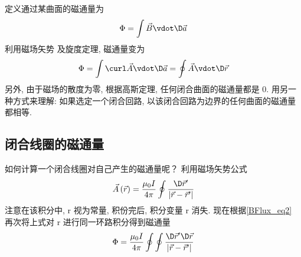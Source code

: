 定义通过某曲面的磁通量为
\begin{equation}
\Phi  = \int {\vec B \vdot \D \vec a} 
\end{equation}
利用磁场矢势%
及旋度定理, %
磁通量变为
\begin{equation} \label{BFlux_eq2}
\Phi  = \int {\curl \vec A \vdot \D \vec a}  = \oint {\vec A \vdot \D \vec r} 
\end{equation}
另外, 由于磁场的散度为零, 根据高斯定理, 任何闭合曲面的磁通量都是 0.
用另一种方式来理解: 如果选定一个闭合回路, 以该闭合回路为边界的任何曲面的磁通量都相等.

\subsection{闭合线圈的磁通量}

如何计算一个闭合线圈对自己产生的磁通量呢？ 利用磁场矢势公式
\begin{equation}
\vec A\left( {\vec r} \right) = \frac{{{\mu _0}I}}{{4\pi }}\oint {\frac{{\D \vec r'}}{{\left| {\vec r - \vec r'} \right|}}} 
\end{equation}
注意在该积分中, \vec r 视为常量, 积份完后, 积分变量 \vec r 消失. 现在根据\autoref{BFlux_eq2} 再次将上式对 \vec r 进行同一环路积分得到磁通量
\begin{equation}
\Phi  = \frac{{{\mu _0}I}}{{4\pi }}\oint {\oint {\frac{{\D \vec r'\D \vec r}}{{\left| {\vec r - \vec r'} \right|}}} } 
\end{equation}

